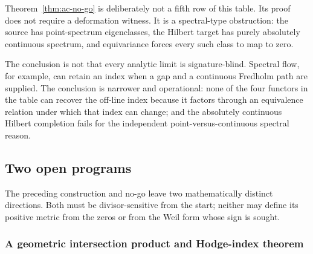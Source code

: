\documentclass[11pt]{amsart}
\theoremstyle{definition}
\theoremstyle{remark}
\begin{document}
Theorem~\ref{thm:ac-no-go} is deliberately not a fifth row of this table.
Its proof does not require a deformation witness.  It is a spectral-type
obstruction: the source has point-spectrum eigenclasses, the Hilbert target
has purely absolutely continuous spectrum, and equivariance forces every
such class to map to zero.

The conclusion is not that every analytic limit is signature-blind.
Spectral flow, for example, can retain an index when a gap and a continuous
Fredholm path are supplied.  The conclusion is narrower and operational:
none of the four functors in the table can recover the off-line index
because it factors through an equivalence relation under which that index
can change; and the absolutely continuous Hilbert completion fails for the
independent point-versus-continuous spectral reason.

\subsection{Two open programs}
\label{subsec:open-programs}

The preceding construction and no-go leave two mathematically distinct
directions.  Both must be divisor-sensitive from the start; neither may
define its positive metric from the zeros or from the Weil form whose sign
is sought.

\subsubsection{A geometric intersection product and Hodge-index theorem}
\end{document}
